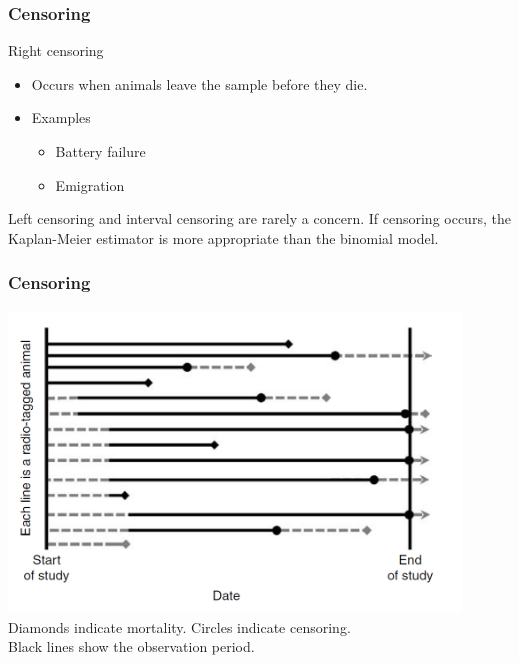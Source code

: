 \documentclass[color=usenames,dvipsnames]{beamer}\usepackage[]{graphicx}\usepackage[]{color}
\begin{document}
\begin{frame}
  \frametitle{Censoring}
  {\large %
    Right censoring} 
  \begin{itemize}
    \normalsize
    \item Occurs when animals leave the sample before they die.
    \item Examples
    \begin{itemize}
      \item Battery failure
      \item Emigration
    \end{itemize}
  \end{itemize}
  \pause
  \vfill
  {\large %
    Left censoring and interval censoring are rarely a concern.}
  \pause
  \vfill
  {\centering If censoring occurs, 
    the Kaplan-Meier estimator is more appropriate than the binomial model. \\}
\end{frame}



\begin{frame}
  \frametitle{Censoring}
  \centering
  \includegraphics[width=0.9\textwidth]{figs/censoring} \\
  Diamonds indicate mortality. Circles indicate censoring. \\
  Black lines show the observation period. \\ %
\end{frame}
\end{document}
